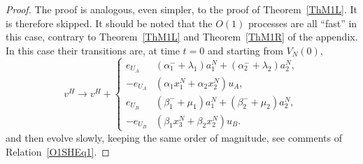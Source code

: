 \documentclass[english]{amsart}
\numberwithin{proposition}{section}
\begin{document}
\begin{proof}
The proof is analogous, even simpler, to the proof of Theorem~\ref{ThM1L}. It is therefore skipped. 
It should be noted that the $O(1)$ processes are all ``fast''  in this case, contrary to Theorem~\ref{ThM1L} and Theorem~\ref{ThM1R} of the appendix. In this case their transitions are, at time $t=0$ and starting from $V_N(0)$,
\[
v^H\longrightarrow v^H{+}
\begin{cases}
e_{U_A}&(\alpha_1^-{+}\lambda_1)a_1^N+(\alpha_2^-{+}\lambda_2)a_2^N,\\
{-}e_{U_A}&(\alpha_1x_1^N{+}\alpha_2x_2^N)u_A,\\
e_{U_B}&(\beta_1^-{+}\mu_1)a_1^N+(\beta_2^-{+}\mu_2)a_2^N,\\
{-}e_{U_B}&(\beta_1x_3^N{+}\beta_2x_2^N)u_B.
\end{cases}
\]
and then evolve slowly, keeping the same order of magnitude, see comments of Relation~\eqref{O1SHEq1}. 
\end{proof}
\end{document}
